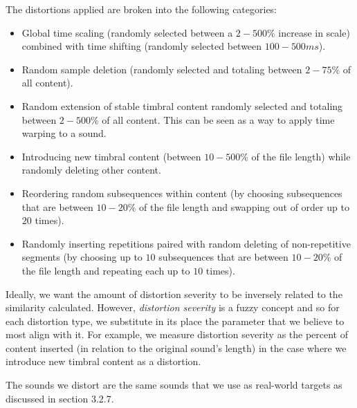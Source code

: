 \documentclass[a4paper,12pt]{report} 	%
\numberwithin{figure}{chapter}
\numberwithin{table}{chapter}
\numberwithin{equation}{chapter}
\begin{document}
\begin{flushleft}
The distortions applied are broken into the following categories:
\begin{itemize}
\item Global time scaling (randomly selected between a $2-500\%$ increase in scale) combined with time shifting (randomly selected between $100-500ms$).
\item Random sample deletion (randomly selected and totaling between $2-75\%$ of all content).
\item Random extension of stable timbral content randomly selected and totaling between $2-500\%$ of all content. This can be seen as a way to apply time warping to a sound.
\item Introducing new timbral content (between $10-500\%$ of the file length) while randomly deleting other content.
\item Reordering random subsequences within content (by choosing subsequences that are between $10-20\%$ of the file length and swapping out of order up to $20$ times).
\item Randomly inserting repetitions paired with random deleting of non-repetitive segments (by choosing up to $10$ subsequences that are between $10-20\%$ of the file length and repeating each up to $10$ times).
\end{itemize}

Ideally, we want the amount of distortion severity to be inversely related to the similarity calculated. However, \emph{distortion severity} is a fuzzy concept and so for each distortion type, we substitute in its place the parameter that we believe to most align with it. For example, we measure distortion severity as the percent of content inserted (in relation to the original sound's length) in the case where we introduce new timbral content as a distortion.

The sounds we distort are the same sounds that we use as real-world targets as discussed in section 3.2.7.


\end{flushleft}
\end{document}
